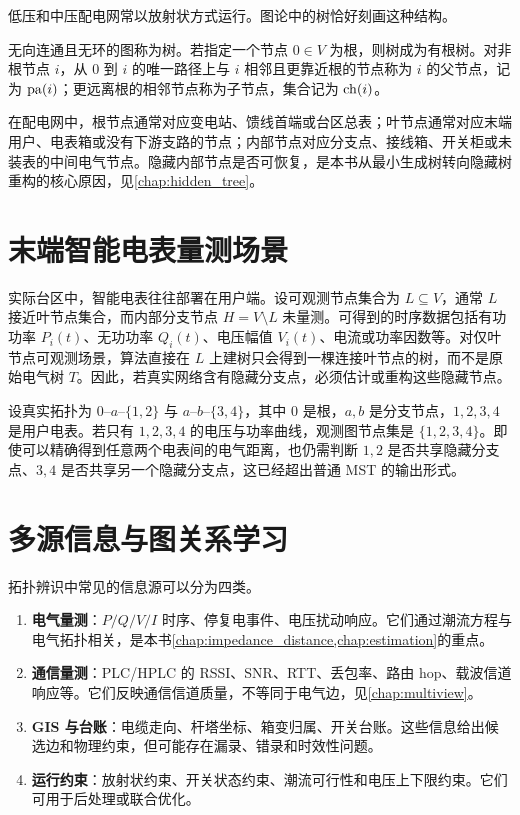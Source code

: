 低压和中压配电网常以放射状方式运行。图论中的树恰好刻画这种结构。

\begin{definition}[树和有根树]
无向连通且无环的图称为树。若指定一个节点 $0\in V$ 为根，则树成为有根树。对非根节点 $i$，从 $0$ 到 $i$ 的唯一路径上与 $i$ 相邻且更靠近根的节点称为 $i$ 的父节点，记为 $\operatorname{pa}(i)$；更远离根的相邻节点称为子节点，集合记为 $\operatorname{ch}(i)$。
\end{definition}

在配电网中，根节点通常对应变电站、馈线首端或台区总表；叶节点通常对应末端用户、电表箱或没有下游支路的节点；内部节点对应分支点、接线箱、开关柜或未装表的中间电气节点。隐藏内部节点是否可恢复，是本书从最小生成树转向隐藏树重构的核心原因，见\cref{chap:hidden_tree}。

\section{末端智能电表量测场景}

实际台区中，智能电表往往部署在用户端。设可观测节点集合为 $L\subseteq V$，通常 $L$ 接近叶节点集合，而内部分支节点 $H=V\setminus L$ 未量测。可得到的时序数据包括有功功率 $P_i(t)$、无功功率 $Q_i(t)$、电压幅值 $V_i(t)$、电流或功率因数等。对仅叶节点可观测场景，算法直接在 $L$ 上建树只会得到一棵连接叶节点的树，而不是原始电气树 $T$。因此，若真实网络含有隐藏分支点，必须估计或重构这些隐藏节点。

\begin{example}[一条馈线的两种观测图]
设真实拓扑为 $0$--$a$--$\{1,2\}$ 与 $a$--$b$--$\{3,4\}$，其中 $0$ 是根，$a,b$ 是分支节点，$1,2,3,4$ 是用户电表。若只有 $1,2,3,4$ 的电压与功率曲线，观测图节点集是 $\{1,2,3,4\}$。即使可以精确得到任意两个电表间的电气距离，也仍需判断 $1,2$ 是否共享隐藏分支点、$3,4$ 是否共享另一个隐藏分支点，这已经超出普通 MST 的输出形式。
\end{example}

\section{多源信息与图关系学习}

拓扑辨识中常见的信息源可以分为四类。

\begin{enumerate}[label=(\arabic*)]
  \item \textbf{电气量测}：$P/Q/V/I$ 时序、停复电事件、电压扰动响应。它们通过潮流方程与电气拓扑相关，是本书\cref{chap:impedance_distance,chap:estimation}的重点。
  \item \textbf{通信量测}：PLC/HPLC 的 RSSI、SNR、RTT、丢包率、路由 hop、载波信道响应等。它们反映通信信道质量，不等同于电气边，见\cref{chap:multiview}。
  \item \textbf{GIS 与台账}：电缆走向、杆塔坐标、箱变归属、开关台账。这些信息给出候选边和物理约束，但可能存在漏录、错录和时效性问题。
  \item \textbf{运行约束}：放射状约束、开关状态约束、潮流可行性和电压上下限约束。它们可用于后处理或联合优化。
\end{enumerate}

